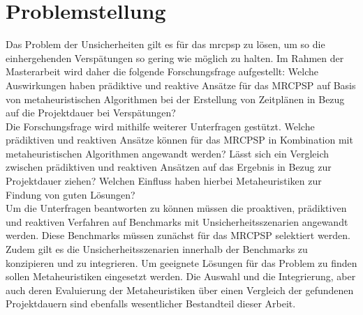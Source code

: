 \section{Problemstellung} \label{sec:Ziele}

Das Problem der Unsicherheiten gilt es für das \ac{mrcpsp} zu lösen, um so die einhergehenden Verspätungen so gering wie möglich zu halten. Im Rahmen der Masterarbeit wird daher die folgende Forschungsfrage aufgestellt: Welche Auswirkungen haben prädiktive und reaktive Ansätze für das MRCPSP auf Basis von metaheuristischen Algorithmen bei der Erstellung von Zeitplänen in Bezug auf die Projektdauer bei Verspätungen? \\

Die Forschungsfrage wird mithilfe weiterer Unterfragen gestützt. Welche prädiktiven und reaktiven Ansätze können für das MRCPSP in Kombination mit metaheuristischen Algorithmen angewandt werden? Lässt sich ein Vergleich zwischen prädiktiven und reaktiven Ansätzen auf das Ergebnis in Bezug zur Projektdauer ziehen? Welchen Einfluss haben hierbei Metaheuristiken zur Findung von \glqq guten\grqq{} Lösungen? \\

Um die Unterfragen beantworten zu können müssen die proaktiven, prädiktiven und reaktiven Verfahren auf Benchmarks mit Unsicherheitsszenarien angewandt werden. Diese Benchmarks müssen zunächst für das MRCPSP selektiert werden. Zudem gilt es die Unsicherheitsszenarien innerhalb der Benchmarks zu konzipieren und zu integrieren. Um geeignete Lösungen für das Problem zu finden sollen Metaheuristiken eingesetzt werden. Die Auswahl und die Integrierung, aber auch deren Evaluierung der Metaheuristiken über einen Vergleich der gefundenen Projektdauern sind ebenfalls wesentlicher Bestandteil dieser Arbeit. 